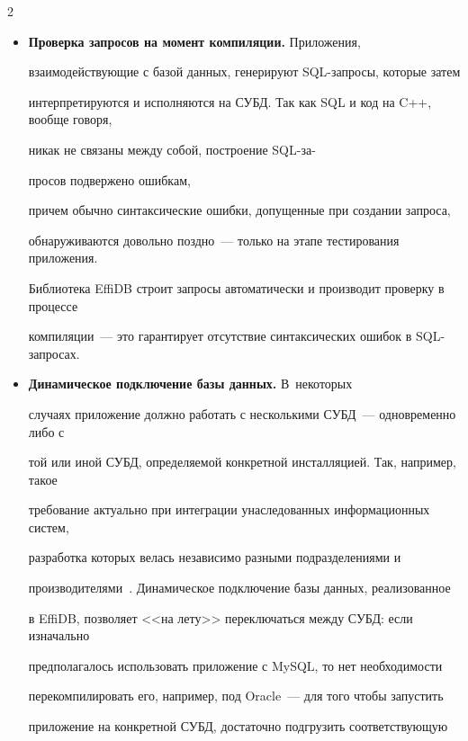 \begin{multicols}{2}
\begin{itemize}
про\-грам\-мное приложение будет работать одинаковым образом на всех 

поддерживаемых СУБД.

\item[$\bullet$] \textbf{Проверка запросов на момент компиляции.} Приложения, 

взаимодействующие с базой данных, генерируют SQL-за\-про\-сы, которые затем 

интерпретируются и исполняются на СУБД. Так как SQL и код на C++, вообще говоря, 

никак не связаны между собой, построение SQL-за-\linebreak\vspace*{-12pt}

\pagebreak



\noindent

про\-сов подвержено ошибкам, 

причем обычно синтаксические ошибки, допущенные при создании запроса, 

обнаруживаются довольно поздно~--- только на этапе тестирования приложения. 

Библиотека EffiDB строит запросы автоматически и производит проверку в процессе 

компиляции~--- это гарантирует отсутствие синтаксических ошибок в SQL-за\-просах.

\item[$\bullet$] \textbf{Динамическое подключение базы данных.} В~некоторых 

случаях приложение должно работать с несколькими СУБД~--- одновременно либо с 

той или иной СУБД, определяемой конкретной инсталляцией. Так, например, такое 

требование актуально при интеграции унаследованных информационных систем, 

разработка которых велась независимо разными подразделениями и 

производителями~\cite{2-y}. Динамическое подключение базы данных, реализованное 

в \mbox{EffiDB}, позволяет <<на лету>> переключаться между СУБД: если изначально 

предполагалось использовать приложение с MySQL, то нет необходимости 

перекомпилировать его, например, под Oracle~--- для того чтобы запустить 

приложение на конкретной СУБД, достаточно подгрузить соответствующую 


\end{itemize}
\end{multicols}
